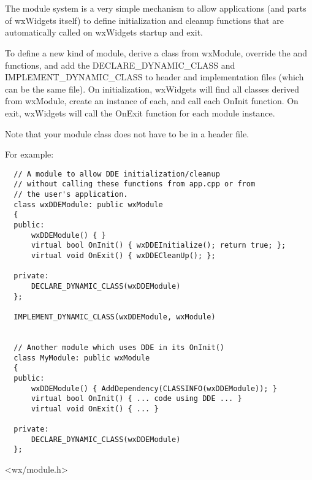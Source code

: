 \section{}\label{wxmodule}

The module system is a very simple mechanism to allow applications (and parts
of wxWidgets itself) to define initialization and cleanup functions that are
automatically called on wxWidgets startup and exit.

To define a new kind of module, derive a class from wxModule, override the
 and  
functions, and add the DECLARE\_DYNAMIC\_CLASS and IMPLEMENT\_DYNAMIC\_CLASS to
header and implementation files (which can be the same file). On
initialization, wxWidgets will find all classes derived from wxModule, create
an instance of each, and call each OnInit function. On exit, wxWidgets will
call the OnExit function for each module instance.

Note that your module class does not have to be in a header file.

For example:

\begin{verbatim}
  // A module to allow DDE initialization/cleanup
  // without calling these functions from app.cpp or from
  // the user's application.
  class wxDDEModule: public wxModule
  {
  public:
      wxDDEModule() { }
      virtual bool OnInit() { wxDDEInitialize(); return true; };
      virtual void OnExit() { wxDDECleanUp(); };

  private:
      DECLARE_DYNAMIC_CLASS(wxDDEModule)
  };

  IMPLEMENT_DYNAMIC_CLASS(wxDDEModule, wxModule)


  // Another module which uses DDE in its OnInit()
  class MyModule: public wxModule
  {
  public:
      wxDDEModule() { AddDependency(CLASSINFO(wxDDEModule)); }
      virtual bool OnInit() { ... code using DDE ... }
      virtual void OnExit() { ... }

  private:
      DECLARE_DYNAMIC_CLASS(wxDDEModule)
  };
\end{verbatim}




<wx/module.h>



\label{wxmodulector}

